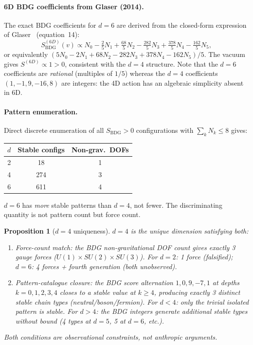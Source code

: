 \documentclass[11pt,a4paper]{article}
\newtheorem{proposition}[theorem]{Proposition}
\begin{document}
\paragraph{6D BDG coefficients from Glaser (2014).}
The exact BDG coefficients for $d = 6$ are derived from the
closed-form expression of Glaser~\citep{Glaser2014} (equation~14):
\begin{equation}
  S_{\mathrm{BDG}}^{(6D)}(v) \propto
  N_0 - \tfrac{2}{5}N_1 + \tfrac{68}{5}N_2
  - \tfrac{282}{5}N_3 + \tfrac{378}{5}N_4 - \tfrac{162}{5}N_5,
  \label{eq:bdg6d}
\end{equation}
or equivalently $(5N_0 - 2N_1 + 68N_2 - 282N_3 + 378N_4 - 162N_5)/5$.
The vacuum gives $S^{(6D)} \propto 1 > 0$, consistent with the
$d = 4$ structure. Note that the $d = 6$ coefficients are
\emph{rational} (multiples of $1/5$) whereas the $d = 4$
coefficients $(1,-1,9,-16,8)$ are integers: the 4D action has an
algebraic simplicity absent in 6D.

\paragraph{Pattern enumeration.}
Direct discrete enumeration of all $S_{\mathrm{BDG}} > 0$
configurations with $\sum_k N_k \leq 8$ gives:
\begin{center}
\begin{tabular}{ccc}
\toprule
$d$ & Stable configs & Non-grav.\ DOFs \\
\midrule
2 & 18  & 1 \\
4 & 274 & 3 \\
6 & 611 & 4 \\
\bottomrule
\end{tabular}
\end{center}
$d = 6$ has \emph{more} stable patterns than $d = 4$, not fewer.
The discriminating quantity is not pattern count but force count.

\begin{proposition}[$d = 4$ uniqueness]
\label{prop:d4}
$d = 4$ is the unique dimension satisfying both:
\begin{enumerate}[noitemsep]
\item \emph{Force-count match}: the BDG non-gravitational DOF count gives
exactly 3 gauge forces ($U(1)\times SU(2)\times SU(3)$). For $d=2$:
1 force (falsified); $d=6$: 4 forces + fourth generation (both unobserved).
\item \emph{Pattern-catalogue closure}: the BDG score alternation
$1, 0, 9, -7, 1$ at depths $k=0,1,2,3,4$ closes to a stable value at
$k \geq 4$, producing exactly 3 distinct stable chain types
(neutral/boson/fermion). For $d < 4$: only the trivial isolated
pattern is stable. For $d > 4$: the BDG integers generate additional
stable types without bound (4 types at $d=5$, 5 at $d=6$, etc.).
\end{enumerate}
Both conditions are observational constraints, not anthropic arguments.
\end{proposition}
\end{document}
